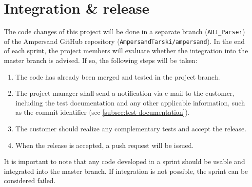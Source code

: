 
\section{Integration \& release}
\label{sec:integration-release}
%
%
The code changes of this project will be done in a separate branch (\texttt{ABI\_Parser}) of the Ampersand GitHub repository (\texttt{AmpersandTarski/ampersand}).
In the end of each sprint, the project members will evaluate whether the integration into the master branch is advised.
If so, the following steps will be taken:
\begin{enumerate}
	\item The code has already been merged and tested in the project branch.
	\item The project manager shall send a notification via e-mail to the customer, including the test documentation and any other applicable information, such as the commit identifier (see \autoref{subsec:test-documentation}).
	\item The customer should realize any complementary tests and accept the release.
	\item When the release is accepted, a push request will be issued.
\end{enumerate}
%
It is important to note that any code developed in a sprint should be usable and integrated into the master branch.
If integration is not possible, the sprint can be considered failed.